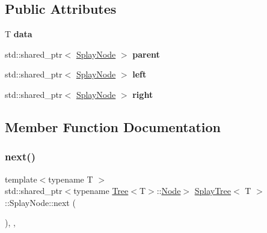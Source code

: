 \subsection*{Public Attributes}
\begin{DoxyCompactItemize}
\item 
\mbox{\label{classSplayTree_1_1SplayNode_a4c3d24b5fe0a6220132892e341c3fe34}} 
T {\bfseries data}
\item 
\mbox{\label{classSplayTree_1_1SplayNode_a8aeaae9e2fa624ee436abd87bd90eefb}} 
std\+::shared\+\_\+ptr$<$ \hyperlink{classSplayTree_1_1SplayNode}{Splay\+Node} $>$ {\bfseries parent}
\item 
\mbox{\label{classSplayTree_1_1SplayNode_abc672e50545562d79fe247fe4959c6a0}} 
std\+::shared\+\_\+ptr$<$ \hyperlink{classSplayTree_1_1SplayNode}{Splay\+Node} $>$ {\bfseries left}
\item 
\mbox{\label{classSplayTree_1_1SplayNode_ac72b70dd81da0a57e1e2678a4da0e0cf}} 
std\+::shared\+\_\+ptr$<$ \hyperlink{classSplayTree_1_1SplayNode}{Splay\+Node} $>$ {\bfseries right}
\end{DoxyCompactItemize}


\subsection{Member Function Documentation}
\mbox{\label{classSplayTree_1_1SplayNode_a958decc1fc4c1c2aa4c80c5fc4e42acd}} 
\subsubsection{\texorpdfstring{next()}{next()}}
{\footnotesize\ttfamily template$<$typename T $>$ \\
std\+::shared\+\_\+ptr$<$typename \hyperlink{classTree}{Tree}$<$T$>$\+::\hyperlink{classTree_1_1Node}{Node}$>$ \hyperlink{classSplayTree}{Splay\+Tree}$<$ T $>$\+::Splay\+Node\+::next (\begin{DoxyParamCaption}{ }\end{DoxyParamCaption})\hspace{0.3cm}{\ttfamily [override]}, {\ttfamily [virtual]}, {\ttfamily [noexcept]}}



